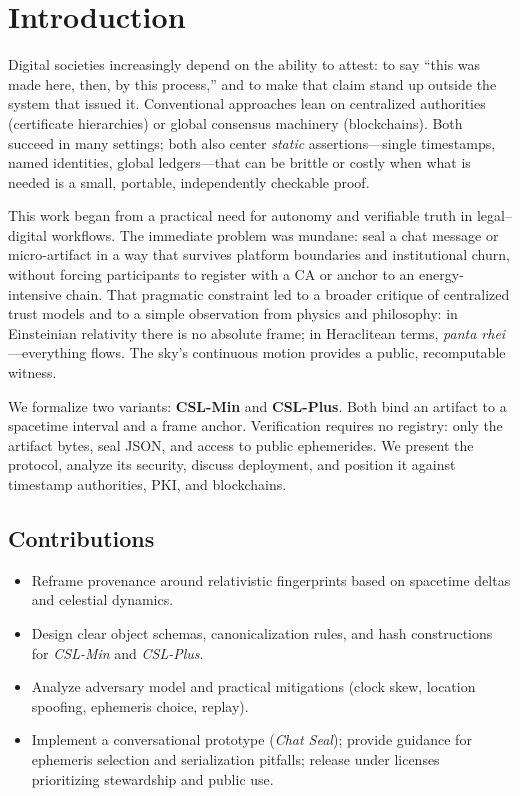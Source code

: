 \documentclass[11pt]{article}
\begin{document}
\section{Introduction}
Digital societies increasingly depend on the ability to attest: to say ``this was made here, then, by this process,'' and to make that claim stand up outside the system that issued it. Conventional approaches lean on centralized authorities (certificate hierarchies) or global consensus machinery (blockchains). Both succeed in many settings; both also center \emph{static} assertions---single timestamps, named identities, global ledgers---that can be brittle or costly when what is needed is a small, portable, independently checkable proof.

This work began from a practical need for autonomy and verifiable truth in legal--digital workflows. The immediate problem was mundane: seal a chat message or micro-artifact in a way that survives platform boundaries and institutional churn, without forcing participants to register with a CA or anchor to an energy-intensive chain. That pragmatic constraint led to a broader critique of centralized trust models and to a simple observation from physics and philosophy: in Einsteinian relativity there is no absolute frame; in Heraclitean terms, \emph{panta rhei}---everything flows. The sky's continuous motion provides a public, recomputable witness.

We formalize two variants: \textbf{CSL-Min} and \textbf{CSL-Plus}. Both bind an artifact to a spacetime interval and a frame anchor. Verification requires no registry: only the artifact bytes, seal JSON, and access to public ephemerides. We present the protocol, analyze its security, discuss deployment, and position it against timestamp authorities, PKI, and blockchains.

\subsection*{Contributions}
\begin{itemize}[leftmargin=1.2em]
\item Reframe provenance around relativistic fingerprints based on spacetime deltas and celestial dynamics.
\item Design clear object schemas, canonicalization rules, and hash constructions for \emph{CSL-Min} and \emph{CSL-Plus}.
\item Analyze adversary model and practical mitigations (clock skew, location spoofing, ephemeris choice, replay).
\item Implement a conversational prototype (\emph{Chat Seal}); provide guidance for ephemeris selection and serialization pitfalls; release under licenses prioritizing stewardship and public use.
\end{itemize}
\end{document}
